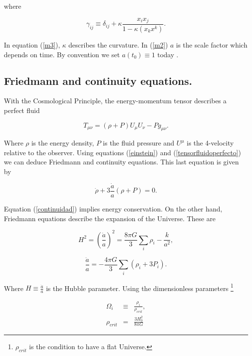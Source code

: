 \documentclass[onecolumn,           %
               showpacs,            %
               preprintnumbers,     %
               aps,                 %
               prl,          	    %
               letterpaper,             %
               superscriptaddress,      %
               nofootinbib,         %
               tightenlines,        %
               floats,floatfix      %
               ,usenatbib,
               ]{revtex4-1}
\begin{document}
where

\begin{equation}
\label{m3}
\gamma_{ij} \equiv \delta_{ij} + \kappa \frac{x_i x_j}{1 - \kappa \left(x_k x^k\right)}.
\end{equation}

In equation (\ref{m3}), $\kappa$ describes the curvature. In (\ref{m2}) $a$ is the scale factor which depends on time. By convention we set $a(t_0) \equiv 1$ today \cite{cambridge}.

\subsection{Friedmann and continuity equations.}
With the Cosmological Principle, the energy-momentum tensor describes a perfect fluid \cite{cambridge}

\begin{equation}
\label{tensorfluidoperfecto}
T_{\mu \nu} = (\rho + P)U_{\mu}U_{\nu} - Pg_{\mu \nu} .
\end{equation} 

Where $\rho$ is the energy density, $P$ is the fluid pressure and $U^{\mu}$ is the 4-velocity relative to the observer. Using equations (\ref{einstein}) and (\ref{tensorfluidoperfecto}) we can deduce Friedmann and continuity equations. This last equation is given by

\begin{equation}
\label{continuidad}
\dot{\rho} + 3 \frac{\dot{a}}{a} \left(\rho + P\right) = 0.
\end{equation}

Equation (\ref{continuidad}) implies energy conservation. On the other hand, Friedmann equations describe the expansion of the Universe. These are

\begin{equation}
\label{friedmann1}
H^2 = \left(\frac{\dot{a}}{a}\right)^2 = \frac{8 \pi G}{3} \sum_{i}\rho_{i} - \frac{k}{a^2} ,
\end{equation}

\begin{equation}
\frac{\ddot{a}}{a} = -\frac{4 \pi G}{3} \sum_{i}\left(\rho_i + 3P_i\right) .
\end{equation}

Where $H \equiv \frac{\dot{a}}{a}$ is the Hubble parameter. Using the dimensionless parameters \footnote{$\rho_{crit}$ is the condition to have a flat Universe.}

\begin{eqnarray}
\Omega_{i} &\equiv& \frac{\rho_i}{\rho_{crit}},\\
\rho_{crit} &=& \frac{3H_0^2}{8 \pi G}
\end{eqnarray} 
\end{document}
